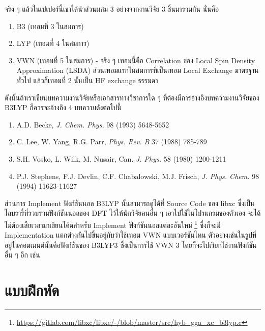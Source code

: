 จริง ๆ แล้วในเปเปอร์นี้เขาได้นำส่วนผสม 3 อย่างจากงานวิจัย 3 ชิ้นมารวมกัน นั่นคือ

\begin{enumerate}[topsep=0pt,noitemsep]
  \item B3 (เทอมที่ 3 ในสมการ)

  \item LYP (เทอมที่ 4 ในสมการ)

  \item VWN (เทอมที่ 5 ในสมการ) - จริง ๆ เทอมนี้คือ Correlation ของ Local Spin Density Approximation (LSDA)
        ส่วนเทอมแรกในสมการที่เป็นเทอม Local Exchange มาตรฐานทั่วไป แล้วก็เทอมที่ 2 นั้นเป็น HF exchange ธรรมดา
\end{enumerate}

ดังนั้นถ้าเราเขียนบทความงานวิจัยหรือเอกสารทางวิชาการใด ๆ ที่ต้องมีการอ้างอิงบทความงานวิจัยของ B3LYP ก็ควรจะอ้างอิง 4 บทความดังต่อไปนี้

\begin{enumerate}[topsep=0pt,noitemsep]
  \item A.D. Becke, \textit{J. Chem. Phys.} 98 (1993) 5648-5652

  \item C. Lee, W. Yang, R.G. Parr, \textit{Phys. Rev. B} 37 (1988) 785-789

  \item S.H. Vosko, L. Wilk, M. Nusair, Can. \textit{J. Phys.} 58 (1980) 1200-1211

  \item P.J. Stephens, F.J. Devlin, C.F. Chabalowski, M.J. Frisch, \textit{J. Phys. Chem.} 98 (1994) 11623-11627
\end{enumerate}

ส่วนการ Implement ฟังก์ชันนอล B3LYP นั้นสามารถดูได้ที่ Source Code ของ libxc ซึ่งเป็นไลบรารี่ที่รวบรวมฟังก์ชันนอลของ DFT
ไว้ให้นักวิจัยคนอื่น ๆ เอาไปใช้ในโปรแกรมของตัวเอง จะได้ไม่ต้องเสียเวลามาเขียนโค้ดสำหรับ Implement ฟังก์ชันนอลแต่ละอันใหม่%
\footnote{\url{https://gitlab.com/libxc/libxc/-/blob/master/src/hyb_gga_xc_b3lyp.c}} ซึ่งก็จะมี Implementation
แตกต่างกันไปขึ้นอยู่กับว่าใช้เทอม VWN แบบเวอร์ชันไหน ตัวอย่างเช่นในรูปที่อยู่ในคอมเมนต์นั้นคือฟังก์ชันของ B3LYP3 ซึ่งเป็นการใช้ VWN 3
โดยก็จะไปเรียกใช้งานฟังก์ชันอื่น ๆ อีก เช่น 

\section{แบบฝึกหัด}


